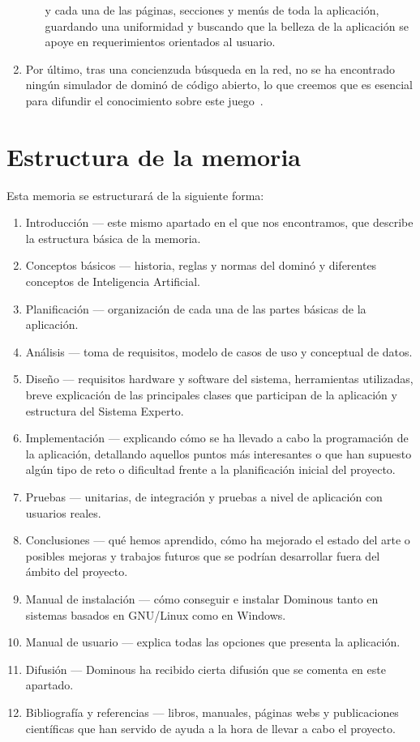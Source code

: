 \begin{enumerate}
\begin{itemize}
                        y cada una de las páginas, secciones y menús de toda la aplicación, guardando
                        una uniformidad y buscando que la belleza de la aplicación se apoye en
                        requerimientos orientados al usuario.
            \end{itemize}
    \item Por último, tras una concienzuda búsqueda en la red, no se
      ha encontrado ningún simulador de dominó de código abierto, lo
      que creemos que es esencial para difundir el conocimiento sobre
      este juego~\cite{stallman2004software}.
\end{enumerate}

\section{Estructura de la memoria}

Esta memoria se estructurará de la siguiente forma:

\begin{enumerate}
    \item Introducción --- este mismo apartado en el que nos encontramos, que describe la estructura básica de la memoria.
    \item Conceptos básicos --- historia, reglas y normas del dominó y diferentes conceptos de Inteligencia Artificial.
    \item Planificación --- organización de cada una de las partes básicas de la aplicación.
    \item Análisis --- toma de requisitos, modelo de casos de uso y conceptual de datos.
    \item Diseño --- requisitos hardware y software del sistema, herramientas utilizadas, breve explicación de las principales
            clases que participan de la aplicación y estructura del Sistema Experto.
    \item Implementación --- explicando cómo se ha llevado a cabo la programación de la aplicación, detallando aquellos puntos
            más interesantes o que han supuesto algún tipo de reto o dificultad frente a la planificación inicial del proyecto.
    \item Pruebas --- unitarias, de integración y pruebas a nivel de aplicación con usuarios reales.
    \item Conclusiones --- qué hemos aprendido, cómo ha mejorado el estado del arte o posibles mejoras y trabajos futuros que
            se podrían desarrollar fuera del ámbito del proyecto.
    \item Manual de instalación --- cómo conseguir e instalar Dominous tanto en sistemas basados en GNU/Linux como en Windows.
    \item Manual de usuario --- explica todas las opciones que presenta la aplicación.
    \item Difusión --- Dominous ha recibido cierta difusión que se comenta en este apartado.
    \item Bibliografía y referencias --- libros, manuales, páginas webs y publicaciones científicas que han servido de ayuda
            a la hora de llevar a cabo el proyecto.
\end{enumerate}
